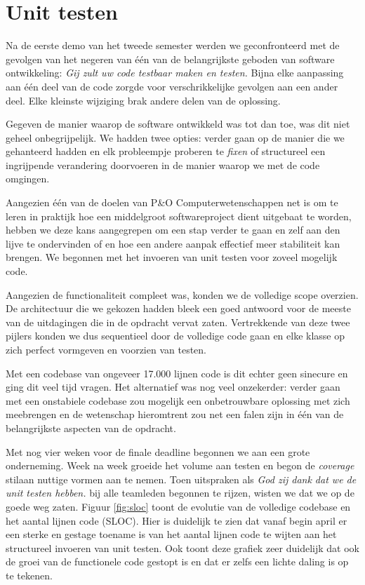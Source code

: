 \documentclass[12pt,a4paper]{report}
\begin{document}
\section{Unit testen}
\label{unittesten}

Na de eerste demo van het tweede semester werden we geconfronteerd met de gevolgen van het negeren van \'e\'en van de belangrijkste geboden van software ontwikkeling: \emph{Gij zult uw code testbaar maken en testen.} Bijna elke aanpassing aan \'e\'en deel van de code zorgde voor verschrikkelijke gevolgen aan een ander deel. Elke kleinste wijziging brak andere delen van de oplossing.

Gegeven de manier waarop de software ontwikkeld was tot dan toe, was dit niet geheel onbegrijpelijk. We hadden twee opties: verder gaan op de manier die we gehanteerd hadden en elk probleempje proberen te \emph{fixen} of structureel een ingrijpende verandering doorvoeren in de manier waarop we met de code omgingen.

Aangezien \'e\'en van de doelen van P\&O Computerwetenschappen net is om te leren in praktijk hoe een middelgroot softwareproject dient uitgebaat te worden, hebben we deze kans aangegrepen om een stap verder te gaan en zelf aan den lijve te ondervinden of en hoe een andere aanpak effectief meer stabiliteit kan brengen. We begonnen met het invoeren van unit testen voor zoveel mogelijk code.

Aangezien de functionaliteit compleet was, konden we de volledige scope overzien. De architectuur die we gekozen hadden bleek een goed antwoord voor de meeste van de uitdagingen die in de opdracht vervat zaten. Vertrekkende van deze twee pijlers konden we dus sequentieel door de volledige code gaan en elke klasse op zich perfect vormgeven en voorzien van testen.

Met een codebase van ongeveer 17.000 lijnen code is dit echter geen sinecure en ging dit veel tijd vragen. Het alternatief was nog veel onzekerder: verder gaan met een onstabiele codebase zou mogelijk een onbetrouwbare oplossing met zich meebrengen en de wetenschap hieromtrent zou net een falen zijn in \'e\'en van de belangrijkste aspecten van de opdracht.

Met nog vier weken voor de finale deadline begonnen we aan een grote onderneming. Week na week groeide het volume aan testen en begon de \emph{coverage} stilaan nuttige vormen aan te nemen. Toen uitspraken als \emph{God zij dank dat we de unit testen hebben.} bij alle teamleden begonnen te rijzen, wisten we dat we op de goede weg zaten. Figuur \ref{fig:sloc} toont de evolutie van de volledige codebase en het aantal lijnen code (SLOC). Hier is duidelijk te zien dat vanaf begin april er een sterke en gestage toename is van het aantal lijnen code te wijten aan het structureel invoeren van unit testen. Ook toont deze grafiek zeer duidelijk dat ook de groei van de functionele code gestopt is en dat er zelfs een lichte daling is op te tekenen.
\end{document}
